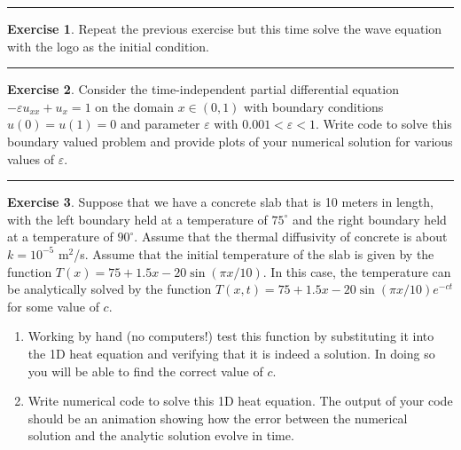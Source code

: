 \documentclass[
]{book}
\theoremstyle{definition}
\theoremstyle{definition}
\theoremstyle{definition}
\newtheorem{exercise}{Exercise}[chapter]
\theoremstyle{remark}
\begin{document}
\begin{center}\rule{0.5\linewidth}{0.5pt}\end{center}

\begin{exercise}
\protect\hypertarget{exr:unnamed-chunk-616}{}{\label{exr:unnamed-chunk-616} }Repeat the previous exercise but this time solve the wave equation with
the logo as the initial condition.
\end{exercise}

\begin{center}\rule{0.5\linewidth}{0.5pt}\end{center}

\begin{exercise}
\protect\hypertarget{exr:unnamed-chunk-617}{}{\label{exr:unnamed-chunk-617} }Consider the time-independent partial differential equation
\(-\varepsilon u_{xx} +  u_x = 1\) on the domain \(x \in (0,1)\) with boundary conditions
\(u(0) = u(1) = 0\) and parameter \(\varepsilon\) with
\(0.001<\varepsilon<1\). Write code to solve this boundary valued problem
and provide plots of your numerical solution for various values of
\(\varepsilon\).
\end{exercise}

\begin{center}\rule{0.5\linewidth}{0.5pt}\end{center}

\begin{exercise}
\protect\hypertarget{exr:unnamed-chunk-618}{}{\label{exr:unnamed-chunk-618} }Suppose that we have a concrete slab that is 10 meters in length, with
the left boundary held at a temperature of \(75^\circ\) and the right
boundary held at a temperature of \(90^\circ\). Assume that the thermal
diffusivity of concrete is about \(k = 10^{-5}\) m\(^2\)/s. Assume that the
initial temperature of the slab is given by the function
\(T(x) = 75 + 1.5x - 20 \sin( \pi x / 10)\). In this case, the temperature
can be analytically solved by the function
\(T(x,t) = 75 + 1.5x - 20 \sin(\pi x / 10)  e^{-ct}\) for some value of \(c\).

\begin{enumerate}
\def\labelenumi{\alph{enumi}.}
\item
  Working by hand (no computers!) test this function by substituting
  it into the 1D heat equation and verifying that it is indeed a
  solution. In doing so you will be able to find the correct value of
  \(c\).
\item
  Write numerical code to solve this 1D heat equation. The output of
  your code should be an animation showing how the error between the
  numerical solution and the analytic solution evolve in time.
\end{enumerate}
\end{exercise}
\end{document}
